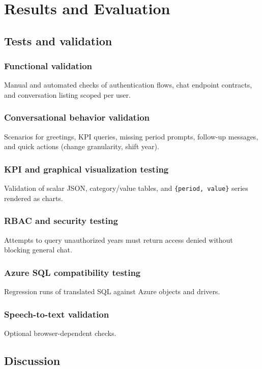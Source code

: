 \documentclass[12pt,a4paper,openany]{report}
\begin{document}
\chapter{Results and Evaluation}

\section{Tests and validation}
\subsection{Functional validation}
Manual and automated checks of authentication flows, chat endpoint contracts, and conversation listing scoped per user.

\subsection{Conversational behavior validation}
Scenarios for greetings, KPI queries, missing period prompts, follow-up messages, and quick actions (change granularity, shift year).

\subsection{KPI and graphical visualization testing}
Validation of scalar JSON, category/value tables, and \texttt{\{period, value\}} series rendered as charts.

\subsection{RBAC and security testing}
Attempts to query unauthorized years must return access denied without blocking general chat.

\subsection{Azure SQL compatibility testing}
Regression runs of translated SQL against Azure objects and drivers.

\subsection{Speech-to-text validation}
Optional browser-dependent checks.

\section{Discussion}
\end{document}
